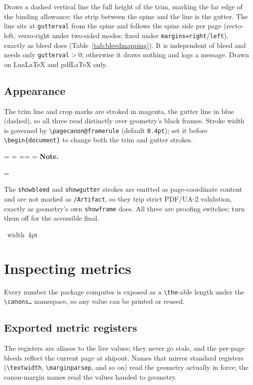 \documentclass[11pt, twoside, openany]{book}
\makeatletter
\newcommand{\pkg}[1]{\textsf{#1}}
\newcommand{\cmd}[1]{\texttt{\textbackslash #1}}
\newcommand*{\cns@tag@artifact@begin}{}
\newcommand*{\cns@tag@artifact@end}{}
\newenvironment{TodoNote}[1][]{%
  \par\addvspace{0.5\baselineskip plus 2pt}%
  \setbox\cns@box=\vbox\bgroup
    \hsize=\linewidth
    \advance\hsize -10pt
    \linewidth=\hsize \columnwidth=\hsize
    \parindent=\z@
    \noindent\textbf{\sffamily Note\cns@ifnotempty{#1}{ \textmd{(#1)}}.}%
    \par\nobreak
    \@afterindentfalse\@afterheading
    \leftskip=\cns@indent\relax
    \ignorespaces
}{%
  \par
  \egroup
  \vbox{\hbox{%
    \cns@tag@artifact@begin\vrule width 4pt\cns@tag@artifact@end
    \hskip 6pt\relax
    \box\cns@box
  }}%
  \par\addvspace{0.5\baselineskip plus 2pt}%
}
\makeatother
\begin{document}
Draws a dashed vertical line the full height of the trim, marking the far edge of the binding allowance: the strip between the spine and the line is the gutter. The line sits at \texttt{gutterval} from the spine and follows the spine side per page (recto-left, verso-right under two-sided modes; fixed under \texttt{margins=right}/\texttt{left}), exactly as bleed does (Table~\ref{tab:bleedmapping}). It is independent of bleed and needs only \texttt{gutterval}${}>0$; otherwise it draws nothing and logs a message. Drawn on Lua\LaTeX{} and pdf\LaTeX{} only.

\section{Appearance}\label{sec:aidappearance}

The trim line and crop marks are stroked in magenta, the gutter line in blue (dashed), so all three read distinctly over \pkg{geometry}'s black frames. Stroke width is governed by \cmd{pagecanon@framerule} (default \texttt{0.4pt}); set it before \cmd{begin}\texttt{\{document\}} to change both the trim and gutter strokes.

\begin{TodoNote}
	The \texttt{showbleed} and \texttt{showgutter} strokes are emitted as page-coordinate content and are not marked as \texttt{/Artifact}, so they trip strict PDF/UA-2 validation, exactly as \pkg{geometry}'s own \texttt{showframe} does. All three are proofing switches; turn them off for the accessible final.
\end{TodoNote}


\chapter{Inspecting metrics}\label{chapter:inspecting}

Every number the package computes is exposed as a \cmd{the}-able length under the \texttt{\textbackslash canons\ldots} namespace, so any value can be printed or reused.

\section{Exported metric registers}\label{sec:metricregisters}

The registers are aliases to the live values; they never go stale, and the per-page bleeds reflect the current page at shipout. Names that mirror standard registers (\cmd{textwidth}, \cmd{marginparsep}, and so on) read the geometry actually in force; the canon-margin names read the values handed to \pkg{geometry}.
\end{document}
